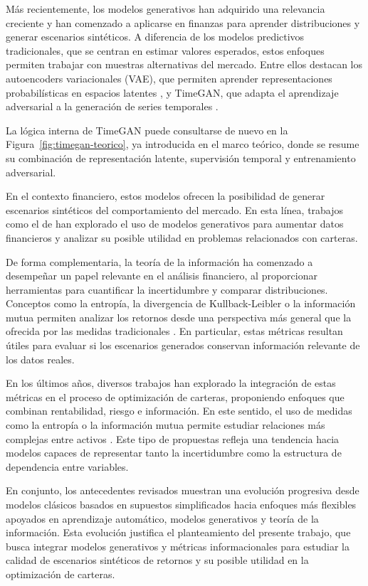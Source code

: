 \documentclass[11pt,a4paper,spanish,oneside]{book}
\numberwithin{equation}{chapter}
\numberwithin{figure}{chapter}
\begin{document}
Más recientemente, los modelos generativos han adquirido una relevancia creciente y han comenzado a aplicarse en finanzas para aprender distribuciones y generar escenarios sintéticos. A diferencia de los modelos predictivos tradicionales, que se centran en estimar valores esperados, estos enfoques permiten trabajar con muestras alternativas del mercado. Entre ellos destacan los autoencoders variacionales (VAE), que permiten aprender representaciones probabilísticas en espacios latentes \cite{Kingma2013}, y TimeGAN, que adapta el aprendizaje adversarial a la generación de series temporales \cite{Yoon2019}.

La lógica interna de TimeGAN puede consultarse de nuevo en la Figura~\ref{fig:timegan-teorico}, ya introducida en el marco teórico, donde se resume su combinación de representación latente, supervisión temporal y entrenamiento adversarial.

En el contexto financiero, estos modelos ofrecen la posibilidad de generar escenarios sintéticos del comportamiento del mercado. En esta línea, trabajos como el de  han explorado el uso de modelos generativos para aumentar datos financieros y analizar su posible utilidad en problemas relacionados con carteras.

De forma complementaria, la teoría de la información ha comenzado a desempeñar un papel relevante en el análisis financiero, al proporcionar herramientas para cuantificar la incertidumbre y comparar distribuciones. Conceptos como la entropía, la divergencia de Kullback-Leibler o la información mutua permiten analizar los retornos desde una perspectiva más general que la ofrecida por las medidas tradicionales \cite{Kullback1951}. En particular, estas métricas resultan útiles para evaluar si los escenarios generados conservan información relevante de los datos reales.

En los últimos años, diversos trabajos han explorado la integración de estas métricas en el proceso de optimización de carteras, proponiendo enfoques que combinan rentabilidad, riesgo e información. En este sentido, el uso de medidas como la entropía o la información mutua permite estudiar relaciones más complejas entre activos \cite{Novais2022}. Este tipo de propuestas refleja una tendencia hacia modelos capaces de representar tanto la incertidumbre como la estructura de dependencia entre variables.

En conjunto, los antecedentes revisados muestran una evolución progresiva desde modelos clásicos basados en supuestos simplificados hacia enfoques más flexibles apoyados en aprendizaje automático, modelos generativos y teoría de la información. Esta evolución justifica el planteamiento del presente trabajo, que busca integrar modelos generativos y métricas informacionales para estudiar la calidad de escenarios sintéticos de retornos y su posible utilidad en la optimización de carteras.
\end{document}
